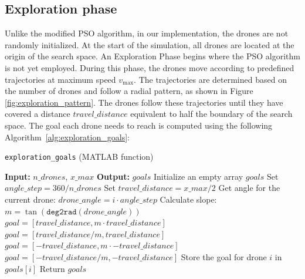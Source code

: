 \subsection{Exploration phase}
\par Unlike the modified PSO algorithm, in our implementation, the drones are not randomly initialized. 
At the start of the simulation, all drones are located at the origin of the search space. 
An Exploration Phase begins where the PSO algorithm is not yet employed. 
During this phase, the drones move according to predefined trajectories at maximum speed $v_{\text{max}}$. 
The trajectories are determined based on the number of drones and follow a radial pattern, as shown in Figure \ref{fig:exploration_pattern}. 
The drones follow these trajectories until they have covered a distance $travel\_distance$ equivalent to half the boundary of the search space.
The goal each drone needs to reach is computed using the following Algorithm~\ref{alg:exploration_goals}:

\begin{algorithm}[H]
    \caption{\texttt{exploration\_goals} (MATLAB function)} \label{alg:exploration_goals}
    \begin{algorithmic}[1]
        \State \textbf{Input:} $n\_{drones}$, $x\_{max}$
        \State \textbf{Output:} $goals$ 
        \State Initialize an empty array $goals$
        \State Set $angle\_step = 360 / n\_{drones}$
        \State Set $travel\_distance = x\_{max} / 2$ 
            \State Get angle for the current drone: $drone\_angle = i \cdot angle\_step$
            \State Calculate slope: $m = \tan(\texttt{deg2rad}(drone\_angle))$
                \State $goal = [travel\_distance, m \cdot travel\_distance]$ 
                \State $goal = [travel\_distance / m, travel\_distance]$ 
                \State $goal = [-travel\_distance, m \cdot -travel\_distance]$ 
                \State $goal = [-travel\_distance / m, -travel\_distance]$ 
            \EndIf
            \State Store the goal for drone $i$ in $goals[i]$
        \EndFor
        \State Return $goals$
    \end{algorithmic}
\end{algorithm}

